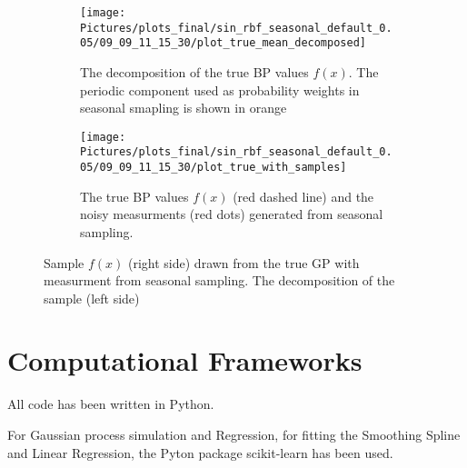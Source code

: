 \begin{figure}[!ht]
\centering
\begin{subfigure}{.45\textwidth}
    \centering
    \texttt{[image: 
        Pictures/plots\_final/sin\_rbf\_seasonal\_default\_0.05/09\_09\_11\_15\_30/plot\_true\_mean\_decomposed]}
    \caption{The decomposition of the true BP values $f(x)$. The periodic component used
    as probability weights in seasonal smapling is shown in orange}
\end{subfigure}\hfill
\begin{subfigure}{.45\textwidth}
    \centering
    \texttt{[image: 
        Pictures/plots\_final/sin\_rbf\_seasonal\_default\_0.05/09\_09\_11\_15\_30/plot\_true\_with\_samples]}
    \caption{The true BP values $f(x)$ (red dashed line) and the noisy measurments (red dots) generated
    from seasonal sampling.}
\end{subfigure}
\caption{Sample $f(x)$  (right side) drawn from the true GP with measurment from seasonal sampling.
The decomposition of the sample (left side)}
\label{fig:seasonal-sampling}
\end{figure}



\section{Computational Frameworks}

All code has been written in Python.

For Gaussian process simulation and Regression, for fitting the Smoothing Spline
and Linear Regression, the Pyton package scikit-learn
has been used.
















